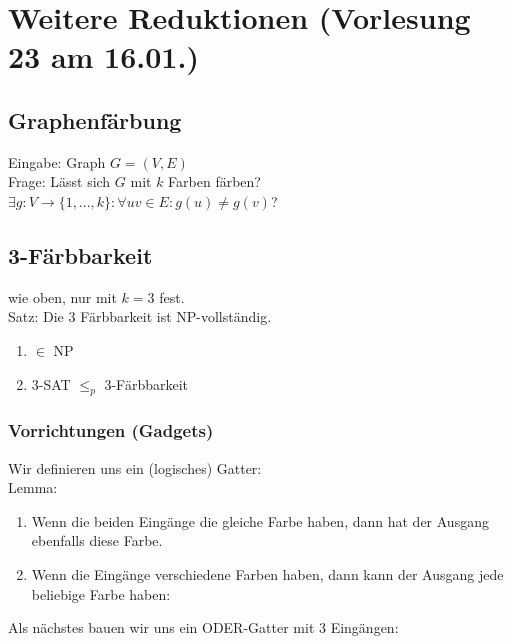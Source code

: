 \section{Weitere Reduktionen \tiny (Vorlesung 23 am 16.01.)}
\subsection{Graphenfärbung}
Eingabe: Graph $G = (V,E)$\\
Frage: Lässt sich $G$ mit $k$ Farben färben?\\
$\exists g: V \rightarrow\{1,...,k\}: \forall uv \in E : g(u) \neq g(v)$?\\
\subsection{3-Färbbarkeit}
wie oben, nur mit $k=3$ fest.\\
Satz: Die 3 Färbbarkeit ist NP-vollständig.\\
\begin{enumerate}
\item $\in$ NP
\item 3-SAT $\leq_p$ 3-Färbbarkeit
\end{enumerate}
\subsubsection{Vorrichtungen (Gadgets)}
Wir definieren uns ein (logisches) Gatter:\\
Lemma: 
\begin{enumerate}
\item Wenn die beiden Eingänge die gleiche Farbe haben, dann hat der Ausgang ebenfalls diese Farbe.

\item Wenn die Eingänge verschiedene Farben haben, dann kann der Ausgang jede beliebige Farbe haben:


\end{enumerate}

Als nächstes bauen wir uns ein ODER-Gatter mit 3 Eingängen:



